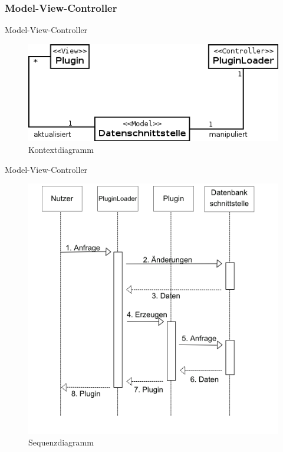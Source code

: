 \documentclass{beamer}
\begin{document}
		\subsubsection[MVC]{Model-View-Controller}
		\begin{frame}{Model-View-Controller}
			\begin{figure}
				\centering
				\includegraphics[width=0.7\linewidth]{Grafik/Diagramm/Pattern/MVC/Kontextdiagramm}
				\caption{Kontextdiagramm}
				\label{fig:Kontext5}
			\end{figure}
		\end{frame}
		\begin{frame}{Model-View-Controller}	
			\begin{figure}
				\centering
				\includegraphics[height=0.8\textheight]{Grafik/Diagramm/Pattern/MVC/Sequenzdiagramm}
				\caption{Sequenzdiagramm}
				\label{fig:Sequenz5}
			\end{figure}
		\end{frame}
		
\end{document}
